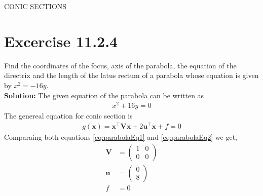\documentclass[12pt]{article}
\providecommand{\brak}[1]{\ensuremath{\left(#1\right)}}
\newcommand{\solution}{\noindent \textbf{Solution: }}
\newcommand{\myvec}[1]{\ensuremath{\begin{pmatrix}#1\end{pmatrix}}}
\let\vec\mathbf
\begin{document}
\begin{center}
\textbf\large{CONIC SECTIONS}

\end{center}
\section*{Excercise 11.2.4}
	Find the coordinates of the focus, axis of the parabola, the equation of the directrix and the length of the latus rectum of a parabola whose equation is given by $x^2=-16y$.\\

\solution
The given equation of the parabola can be written as
\begin{align}
	\label{eq:parabolaEq1}
	x^2+16y=0
\end{align}
The genereal equation for conic section is
\begin{align}
	\label{eq:parabolaEq2}
	g\brak{\vec{x}}=\vec{x}^\top \vec{V}\vec{x}+2\vec{u}^\top \vec{x}+f=0
\end{align}
Comparaing both equations \eqref{eq:parabolaEq1} and \eqref{eq:parabolaEq2} we get,
\begin{align}
	\label{eq:eqV}
	\vec{V} &= \myvec{1&0\\0&0}\\
	\label{eq:eqU}
	\vec{u} &= \myvec{0\\8}\\
	\label{eq:eqF}
	f &= 0
\end{align}
\end{document}
